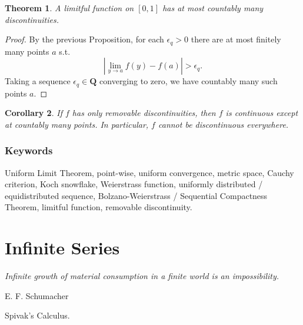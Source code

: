 \documentclass[12pt]{article}
\theoremstyle{plain}
\newtheorem{theorem}{Theorem}
\newtheorem{corollary}[theorem]{Corollary}
\theoremstyle{definition}
\theoremstyle{remark}
\newcommand{\Q}{\mathbf Q}
\begin{document}
\begin{theorem}
A limitful function on $[0, 1]$ has at most countably many discontinuities.
\end{theorem}

\begin{proof}
By the previous Proposition, for each $\epsilon_q > 0$ there are at most finitely many points $a$ s.t. $$|\lim\limits_{y\to a} f(y) - f(a)| > \epsilon_q.$$ Taking a sequence $\epsilon_q \in \Q$ converging to zero, we have countably many such points $a$.
\end{proof}

\begin{corollary}
If $f$ has only removable discontinuities, then $f$ is continuous except at countably many points. In particular, $f$ cannot be discontinuous everywhere.
\end{corollary}

\section{Keywords}

Uniform Limit Theorem, point-wise, uniform convergence, metric space, Cauchy criterion, Koch snowflake, Weierstrass function, uniformly distributed / equidistributed sequence, Bolzano-Weierstrass / Sequential Compactness Theorem, limitful function, removable discontinuity.

\part{Infinite Series}

\epigraph{\textit{Infinite growth of material consumption in a finite world is an impossibility.}}{E. F. Schumacher}

\begin{thebibliography}{99}

 Spivak's Calculus.

\end{thebibliography}
\end{document}
